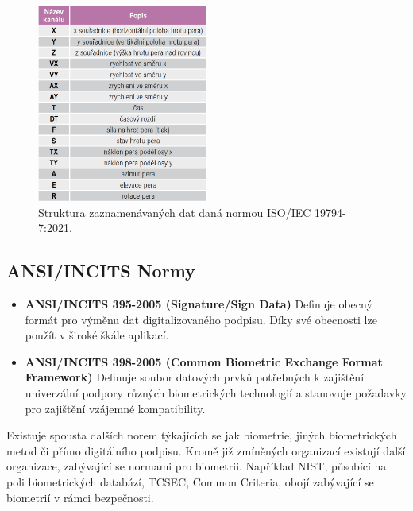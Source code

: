 \begin{figure}[h]\label{fig:norms_table}
  \centering
  \includegraphics[width=0.5\textwidth]{obrazky-figures/normy.png}
  \caption{Struktura zaznamenávaných dat daná normou ISO/IEC 19794-7:2021.} %
\end{figure}

\subsection*{ANSI/INCITS Normy}
\begin{itemize}
  \item \textbf{ANSI/INCITS 395-2005 (Signature/Sign Data)}  
  Definuje obecný formát pro výměnu dat digitalizovaného podpisu. Díky své obecnosti lze použít v široké škále aplikací. %
  
  \item \textbf{ANSI/INCITS 398-2005 (Common Biometric Exchange Format Framework)}  
  Definuje soubor datových prvků potřebných k zajištění univerzální podpory různých biometrických technologií a stanovuje požadavky pro zajištění vzájemné kompatibility. %
\end{itemize}

Existuje spousta dalších norem týkajících se jak biometrie, jiných biometrických metod či přímo digitálního podpisu.                %
Kromě již zmíněných organizací existují další organizace, zabývající se normami pro biometrii.                                      %
Například NIST, působící na poli biometrických databází, TCSEC, Common Criteria, obojí zabývající se biometrií v rámci bezpečnosti. %


